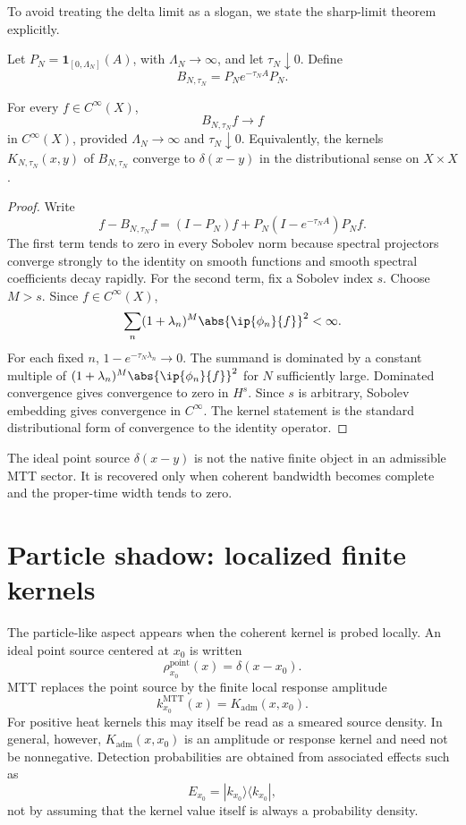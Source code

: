 \documentclass[11pt]{article}
\newcommand{\Kadm}{K_{\mathrm{adm}}}
\begin{document}
To avoid treating the delta limit as a slogan, we state the sharp-limit theorem explicitly.

Let \(P_N=\mathbf 1_{[0,\Lambda_N]}(A)\), with \(\Lambda_N\to\infty\), and let
\(\tau_N\downarrow0\). Define
\begin{equation}
  B_{N,\tau_N}
  =
  P_N e^{-\tau_N A}P_N.
  \label{eq:BNtau}
\end{equation}

\begin{theorem}
\label{thm:delta-limit}
For every \(f\in C^\infty(X)\),
\[
  B_{N,\tau_N}f\to f
\]
in \(C^\infty(X)\), provided \(\Lambda_N\to\infty\) and \(\tau_N\downarrow0\). Equivalently,
the kernels \(K_{N,\tau_N}(x,y)\) of \(B_{N,\tau_N}\) converge to \(\delta(x-y)\) in the
distributional sense on \(X\times X\).
\end{theorem}

\begin{proof}
Write
\[
  f-B_{N,\tau_N}f
  =
  (I-P_N)f+P_N(I-e^{-\tau_NA})P_Nf.
\]
The first term tends to zero in every Sobolev norm because spectral projectors converge
strongly to the identity on smooth functions and smooth spectral coefficients decay rapidly.
For the second term, fix a Sobolev index \(s\). Choose \(M>s\). Since \(f\in C^\infty(X)\),
\[
  \sum_n (1+\lambda_n)^M\abs{\ip{\phi_n}{f}}^2<\infty.
\]
For each fixed \(n\), \(1-e^{-\tau_N\lambda_n}\to0\). The summand is dominated by a
constant multiple of \((1+\lambda_n)^M\abs{\ip{\phi_n}{f}}^2\) for \(N\) sufficiently large.
Dominated convergence gives convergence to zero in \(H^s\). Since \(s\) is arbitrary,
Sobolev embedding gives convergence in \(C^\infty\). The kernel statement is the standard
distributional form of convergence to the identity operator.
\end{proof}

\begin{corollary}
The ideal point source \(\delta(x-y)\) is not the native finite object in an admissible MTT
sector. It is recovered only when coherent bandwidth becomes complete and the proper-time
width tends to zero.
\end{corollary}

\section{Particle shadow: localized finite kernels}

The particle-like aspect appears when the coherent kernel is probed locally. An ideal point
source centered at \(x_0\) is written
\[
  \rho_{x_0}^{\mathrm{point}}(x)=\delta(x-x_0).
\]
MTT replaces the point source by the finite local response amplitude
\[
  k_{x_0}^{\mathrm{MTT}}(x)
  =
  \Kadm(x,x_0).
\]
For positive heat kernels this may itself be read as a smeared source density. In general,
however, \(\Kadm(x,x_0)\) is an amplitude or response kernel and need not be nonnegative.
Detection probabilities are obtained from associated effects such as
\[
  E_{x_0}=|k_{x_0}\rangle\langle k_{x_0}|,
\]
not by assuming that the kernel value itself is always a probability density.
\end{document}
